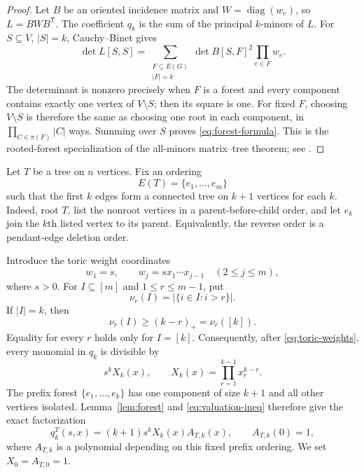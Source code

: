 \documentclass[11pt,reqno]{amsart}
\theoremstyle{definition}
\theoremstyle{remark}
\newcommand{\diag}{\operatorname{diag}}
\begin{document}
\begin{proof}
Let $B$ be an oriented incidence matrix and $W=\diag(w_e)$, so
$L=BWB^{\mathsf T}$.  The coefficient $q_k$ is the sum of the principal
$k$-minors of $L$.  For $S\subseteq V$, $|S|=k$, Cauchy--Binet gives
\[
 \det L[S,S]=
 \sum_{\substack{F\subseteq E(G)\\|F|=k}}
 \det B[S,F]^2\prod_{e\in F}w_e.
\]
The determinant is nonzero precisely when $F$ is a forest and every
component contains exactly one vertex of $V\setminus S$; then its square is
one.  For fixed $F$, choosing $V\setminus S$ is therefore the same as
choosing one root in each component, in
$\prod_{C\in\pi(F)}|C|$ ways.  Summing over $S$ proves
\eqref{eq:forest-formula}.  This is the rooted-forest specialization of the
all-minors matrix--tree theorem; see \cite{Chaiken1982}.
\end{proof}

Let $T$ be a tree on $n$ vertices.  Fix an ordering
\begin{equation}\label{eq:prefix-order}
 E(T)=\{e_1,\ldots,e_m\}
\end{equation}
such that the first $k$ edges form a connected tree on $k+1$ vertices for
each $k$.  Indeed, root $T$, list the nonroot vertices in a
parent-before-child order, and let $e_k$ join the $k$th listed vertex to its
parent.  Equivalently, the reverse order is a pendant-edge deletion order.

Introduce the toric weight coordinates
\begin{equation}\label{eq:toric-weights}
 w_1=s,\qquad w_j=sx_1\cdots x_{j-1}\quad(2\le j\le m),
\end{equation}
where $s>0$.  For $I\subseteq[m]$ and $1\le r\le m-1$, put
\[
 \nu_r(I)=|\{i\in I:i>r\}|.
\]
If $|I|=k$, then
\begin{equation}\label{eq:valuation-ineq}
 \nu_r(I)\ge(k-r)_+=\nu_r([k]).
\end{equation}
Equality for every $r$ holds only for $I=[k]$.  Consequently, after
\eqref{eq:toric-weights}, every monomial in $q_k$ is divisible by
\[
 s^kX_k(x),\qquad X_k(x)=\prod_{r=1}^{k-1}x_r^{k-r}.
\]
The prefix forest $\{e_1,\ldots,e_k\}$ has one component of size $k+1$
and all other vertices isolated.  Lemma~\ref{lem:forest} and
\eqref{eq:valuation-ineq} therefore give the exact factorization
\begin{equation}\label{eq:tree-factorization}
 q_k^T(s,x)=(k+1)s^kX_k(x)A_{T,k}(x),
 \qquad A_{T,k}(0)=1,
\end{equation}
where $A_{T,k}$ is a polynomial depending on this fixed prefix ordering.
We set $X_0=A_{T,0}=1$.
\end{document}
